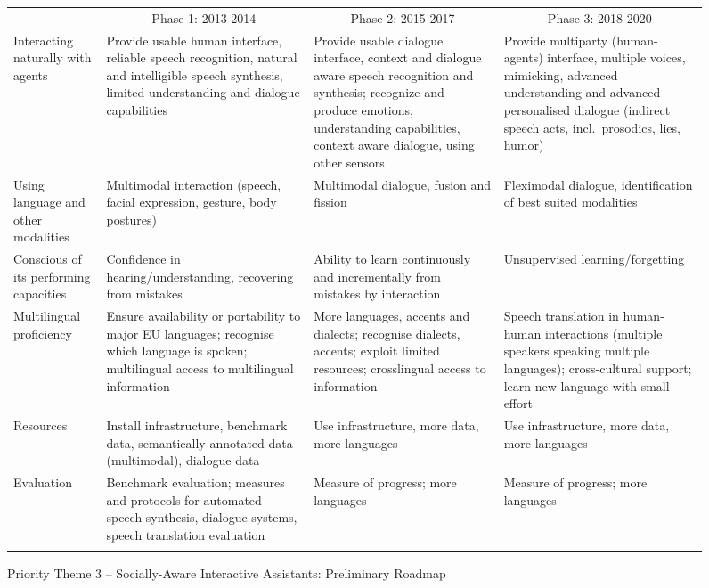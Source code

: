 \documentclass[10pt, plain]{../../metanetpaper}
\begin{document}
\begin{multicols}{2}
\begin{figure}[htb]
  \centering
  \small
  \begin{tabular}{@{}p{2.5cm}p{4cm}p{4cm}p{4cm}@{}} \toprule\addlinespace
    \multicolumn{1}{c}{Research Priority} & \multicolumn{1}{c}{Phase 1: 2013-2014} & \multicolumn{1}{c}{Phase 2: 2015-2017} & \multicolumn{1}{c}{Phase 3: 2018-2020} \\ \addlinespace\midrule\addlinespace
    Interacting naturally with agents & Provide usable human interface, reliable speech recognition, natural and intelligible speech synthesis, limited understanding and dialogue capabilities & Provide usable dialogue interface, context and dialogue aware speech recognition and synthesis; recognize and produce emotions,  understanding capabilities, context aware dialogue, using other sensors & Provide multiparty (human-agents) interface, multiple voices, mimicking, advanced understanding and advanced personalised dialogue (indirect speech acts, incl.~prosodics, lies, humor) \\ \addlinespace
    Using language and other modalities & Multimodal interaction (speech, facial expression, gesture, body postures) & Multimodal dialogue, fusion and fission & Fleximodal dialogue, identification of best suited modalities \\ \addlinespace
    Conscious of its performing capacities & Confidence in hearing/understanding, recovering from mistakes & Ability to learn continuously and incrementally from mistakes by interaction & Unsupervised learning/forgetting \\ \addlinespace
    Multilingual proficiency & Ensure availability or portability to major EU languages; recognise which language is spoken; multilingual access to multilingual information & More languages, accents and dialects; recognise dialects, accents; exploit limited resources; crosslingual access to information & Speech translation in human-human interactions (multiple speakers speaking multiple languages); cross-cultural support; learn new language with small effort \\ \addlinespace
    Resources & Install infrastructure, benchmark data, semantically annotated data (multimodal), dialogue data & Use infrastructure, more data, more languages & Use infrastructure, more data, more languages \\ \addlinespace
    Evaluation & Benchmark evaluation; measures and protocols for automated speech synthesis, dialogue systems, speech translation evaluation & Measure of progress; more languages & Measure of progress; more languages \\ \addlinespace\bottomrule
  \end{tabular}
  \caption{Priority Theme 3 -- Socially-Aware Interactive Assistants: Preliminary Roadmap}
  \label{fig:pt3-roadmap}
\end{figure}


\end{multicols}
\end{document}
